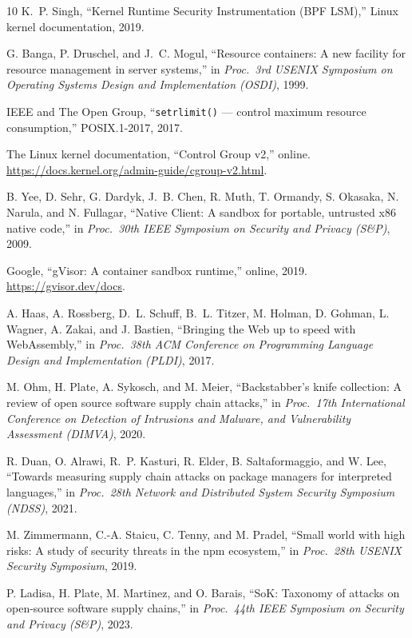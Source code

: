 \documentclass[letterpaper,twocolumn,10pt]{article}
\begin{document}
\begin{thebibliography}{10}
K.~P. Singh,
``Kernel Runtime Security Instrumentation (BPF LSM),''
Linux kernel documentation, 2019.

G. Banga, P. Druschel, and J.~C. Mogul,
``Resource containers: A new facility for resource management in server systems,''
in \emph{Proc.\ 3rd USENIX Symposium on Operating Systems Design and Implementation (OSDI)}, 1999.

IEEE and The Open Group,
``\texttt{setrlimit()} --- control maximum resource consumption,''
POSIX.1-2017, 2017.

The Linux kernel documentation,
``Control Group v2,''
online. \url{https://docs.kernel.org/admin-guide/cgroup-v2.html}.

B. Yee, D. Sehr, G. Dardyk, J.~B. Chen, R. Muth, T. Ormandy,
S. Okasaka, N. Narula, and N. Fullagar,
``Native Client: A sandbox for portable, untrusted x86 native code,''
in \emph{Proc.\ 30th IEEE Symposium on Security and Privacy (S\&P)}, 2009.

Google,
``gVisor: A container sandbox runtime,''
online, 2019. \url{https://gvisor.dev/docs}.

A. Haas, A. Rossberg, D.~L. Schuff, B.~L. Titzer, M. Holman,
D. Gohman, L. Wagner, A. Zakai, and J. Bastien,
``Bringing the Web up to speed with WebAssembly,''
in \emph{Proc.\ 38th ACM Conference on Programming Language Design and Implementation (PLDI)}, 2017.

M. Ohm, H. Plate, A. Sykosch, and M. Meier,
``Backstabber's knife collection: A review of open source software supply chain attacks,''
in \emph{Proc.\ 17th International Conference on Detection of Intrusions and Malware, and Vulnerability Assessment (DIMVA)}, 2020.

R. Duan, O. Alrawi, R.~P. Kasturi, R. Elder, B. Saltaformaggio, and W. Lee,
``Towards measuring supply chain attacks on package managers for interpreted languages,''
in \emph{Proc.\ 28th Network and Distributed System Security Symposium (NDSS)}, 2021.

M. Zimmermann, C.-A. Staicu, C. Tenny, and M. Pradel,
``Small world with high risks: A study of security threats in the npm ecosystem,''
in \emph{Proc.\ 28th USENIX Security Symposium}, 2019.

P. Ladisa, H. Plate, M. Martinez, and O. Barais,
``SoK: Taxonomy of attacks on open-source software supply chains,''
in \emph{Proc.\ 44th IEEE Symposium on Security and Privacy (S\&P)}, 2023.


\end{thebibliography}
\end{document}
